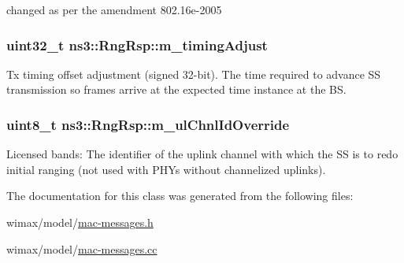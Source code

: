 changed as per the amendment 802.\+16e-\/2005 

\subsubsection[{\texorpdfstring{m\+\_\+timing\+Adjust}{m_timingAdjust}}]{\setlength{\rightskip}{0pt plus 5cm}uint32\+\_\+t ns3\+::\+Rng\+Rsp\+::m\+\_\+timing\+Adjust\hspace{0.3cm}{\ttfamily [private]}}\hypertarget{classns3_1_1RngRsp_ad5a122d3cc7cf596f00d0abc711d9062}{}\label{classns3_1_1RngRsp_ad5a122d3cc7cf596f00d0abc711d9062}
Tx timing offset adjustment (signed 32-\/bit). The time required to advance SS transmission so frames arrive at the expected time instance at the BS. 
\subsubsection[{\texorpdfstring{m\+\_\+ul\+Chnl\+Id\+Override}{m_ulChnlIdOverride}}]{\setlength{\rightskip}{0pt plus 5cm}uint8\+\_\+t ns3\+::\+Rng\+Rsp\+::m\+\_\+ul\+Chnl\+Id\+Override\hspace{0.3cm}{\ttfamily [private]}}\hypertarget{classns3_1_1RngRsp_a8f7fff24a6ac3f55bc935b7cc7234090}{}\label{classns3_1_1RngRsp_a8f7fff24a6ac3f55bc935b7cc7234090}
Licensed bands\+: The identifier of the uplink channel with which the SS is to redo initial ranging (not used with P\+H\+Ys without channelized uplinks). 

The documentation for this class was generated from the following files\+:\begin{DoxyCompactItemize}
\item 
wimax/model/\hyperlink{mac-messages_8h}{mac-\/messages.\+h}\item 
wimax/model/\hyperlink{mac-messages_8cc}{mac-\/messages.\+cc}\end{DoxyCompactItemize}
